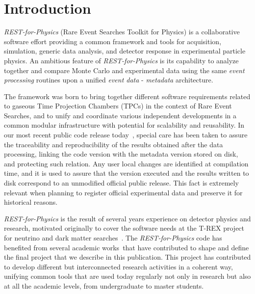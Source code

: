 \section{Introduction}
\label{sec:intro}



\emph{REST-for-Physics} (Rare Event Searches Toolkit for Physics) is a collaborative software effort providing a common framework and tools for acquisition, simulation, generic data analysis, and detector response in experimental particle physics. An ambitious feature of \emph{REST-for-Physics} is its capability to analyze together and compare Monte Carlo and experimental data using the same \emph{event processing} routines upon a unified \emph{event data} - \emph{metadata} architecture. 

The framework was born to bring together different software requirements related to gaseous Time Projection Chambers (TPCs) in the context of Rare Event Searches, and to unify and coordinate various independent developments in a common modular infrastructure with potential for scalability and reusability. In our most recent public code release today~\cite{javier_galan_2021_4692983}, special care has been taken to assure the traceability and reproducibility of the results obtained after the data processing, linking the code version with the metadata version stored on disk, and protecting such relation. Any user local changes are identified at compilation time, and it is used to assure that the version executed and the results written to disk correspond to an unmodified official public release. This fact is extremely relevant when planning to register official experimental data and preserve it for historical reasons.

\emph{REST-for-Physics} is the result of several years experience on detector physics and research, motivated originally to cover the software needs at the T-REX project for neutrino and dark matter searches~\cite{Irastorza:2015dcb,Irastorza:2015geo}. The \emph{REST-for-Physics} code has benefited from several academic works\,\cite{IguazThesis,tomas2013development,SeguiThesis,HerreraThesis,GraciaThesis, GarciaPascualThesis, RuizThesis} that have contributed to shape and define the final project that we describe in this publication.
This project has contributed to develop different but interconnected research activities in a coherent way, unifying common tools that are used today regularly not only in research but also at all the academic levels, from undergraduate to master students. 

